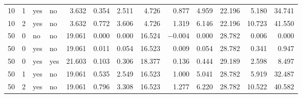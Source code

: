 \begin{table}[!t]
\begin{tabular}{@{}rrllrrrrrrrrr@{}}
10 & 1 & yes & no & 3.632 & 0.354 & 2.511 & 4.726 & 0.877 & 4.959 & 22.196 & 5.180 & 34.741 \\
10 & 2 & yes & no & 3.632 & 0.772 & 3.606 & 4.726 & 1.319 & 6.146 & 22.196 & 10.723 & 41.550 \\
50 & 0 & no & no & 19.061 & 0.000 & 0.000 & 16.524 & $-0.004$ & 0.000 & 28.782 & 0.006 & 0.000 \\
50 & 0 & yes & no & 19.061 & 0.011 & 0.054 & 16.523 & 0.009 & 0.054 & 28.782 & 0.341 & 0.947 \\
50 & 0 & yes & yes & 21.603 & 0.103 & 0.306 & 18.377 & 0.136 & 0.444 & 29.189 & 2.598 & 8.497 \\
50 & 1 & yes & no & 19.061 & 0.535 & 2.549 & 16.523 & 1.000 & 5.041 & 28.782 & 5.919 & 32.487 \\
50 & 2 & yes & no & 19.061 & 0.796 & 3.308 & 16.523 & 1.277 & 6.220 & 28.782 & 10.522 & 40.582 \\
\bottomrule
\end{tabular}
\end{table}
